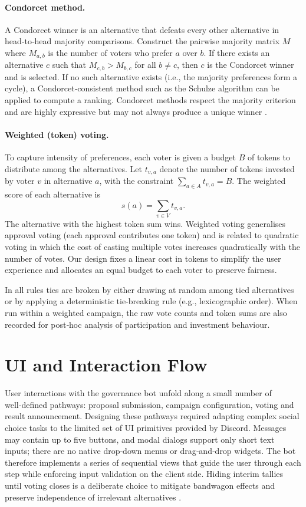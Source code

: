\paragraph{Condorcet method.}  A Condorcet winner is an alternative
that defeats every other alternative in head‑to‑head majority
comparisons.  Construct the pairwise majority matrix $M$ where
$M_{a,b}$ is the number of voters who prefer $a$ over $b$.
If there exists an alternative $c$ such that $M_{c,b} > M_{b,c}$
for all $b \neq c$, then $c$ is the Condorcet winner and is
selected.  If no such alternative exists (i.e., the majority
preferences form a cycle), a Condorcet‑consistent method such as the
Schulze algorithm can be applied to compute a ranking.  Condorcet
methods respect the majority criterion and are highly expressive but
may not always produce a unique winner \cite{Condorcet1785}.

\paragraph{Weighted (token) voting.}  To capture intensity of
preferences, each voter is given a budget $B$ of tokens to distribute
among the alternatives.  Let $t_{v,a}$ denote the number of tokens
invested by voter $v$ in alternative $a$, with the constraint
$\sum_{a \in A} t_{v,a} = B$.  The weighted score of each
alternative is
\begin{equation}
    s(a) = \sum_{v \in V} t_{v,a}.
\end{equation}
The alternative with the highest token sum wins.  Weighted voting
generalises approval voting (each approval contributes one token) and
is related to quadratic voting in which the cost of casting multiple
votes increases quadratically with the number of votes.  Our design
fixes a linear cost in tokens to simplify the user experience and
allocates an equal budget to each voter to preserve fairness.

In all rules ties are broken by either drawing at random among tied
alternatives or by applying a deterministic tie‑breaking rule (e.g.,
lexicographic order).  When run within a weighted campaign, the raw
vote counts and token sums are also recorded for post‑hoc analysis of
participation and investment behaviour.

\section{UI and Interaction Flow}

User interactions with the governance bot unfold along a small number of
well‑defined pathways: proposal submission, campaign configuration,
voting and result announcement.  Designing these pathways required
adapting complex social choice tasks to the limited set of UI
primitives provided by Discord.  Messages may contain up to five
buttons, and modal dialogs support only short text inputs; there are no
native drop‑down menus or drag‑and‑drop widgets.  The bot therefore
implements a series of sequential views that guide the user through each
step while enforcing input validation on the client side.  Hiding
interim tallies until voting closes is a deliberate choice to mitigate
bandwagon effects and preserve independence of irrelevant alternatives
\cite{Arrow1951}.


